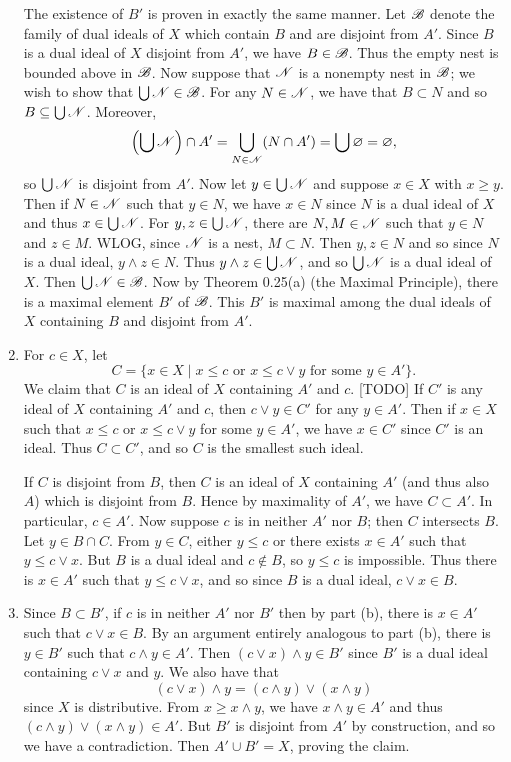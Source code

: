 \begin{prob}
\begin{enumerate}
The existence of $B'$ is proven in exactly the same manner. Let $\mathscr{B}$ denote the family of dual ideals of $X$ which contain $B$ and are disjoint from $A'$. Since $B$ is a dual ideal of $X$ disjoint from $A'$, we have $B \in \mathscr{B}$. Thus the empty nest is bounded above in $\mathscr{B}$. Now suppose that $\mathscr{N}$ is a nonempty nest in $\mathscr{B}$; we wish to show that $\bigcup\mathscr{N} \in \mathscr{B}$. For any $N \in \mathscr{N}$, we have that $B \subset N$ and so $B \subseteq \bigcup\mathscr{N}$. Moreover, \[\left(\bigcup\mathscr{N}\right)\cap A' = \bigcup_{N \in \mathscr{N}}(N\cap A') = \bigcup\varnothing = \varnothing,\] so $\bigcup\mathscr{N}$ is disjoint from $A'$. Now let $y \in \bigcup\mathscr{N}$ and suppose $x \in X$ with $x\geq y$. Then if $N \in \mathscr{N}$ such that $y \in N$, we have $x \in N$ since $N$ is a dual ideal of $X$ and thus $x \in \bigcup\mathscr{N}$. For $y, z \in \bigcup\mathscr{N}$, there are $N, M \in \mathscr{N}$ such that $y \in N$ and $z \in M$. WLOG, since $\mathscr{N}$ is a nest, $M \subset N$. Then $y, z \in N$ and so since $N$ is a dual ideal, $y\wedge z \in N$. Thus $y \wedge z \in \bigcup\mathscr{N}$, and so $\bigcup\mathscr{N}$ is a dual ideal of $X$. Then $\bigcup\mathscr{N} \in \mathscr{B}$. Now by Theorem 0.25(a) (the Maximal Principle), there is a maximal element $B'$ of $\mathscr{B}$. This $B'$ is maximal among the dual ideals of $X$ containing $B$ and disjoint from $A'$.

\item For $c \in X$, let \[C = \{x \in X\mid x \leq c\text{ or } x \leq c\vee y\text{ for some }y \in A'\}.\] We claim that $C$ is an ideal of $X$ containing $A'$ and $c$. [TODO] If $C'$ is any ideal of $X$ containing $A'$ and $c$, then $c\vee y \in C'$ for any $y \in A'$. Then if $x \in X$ such that $x \leq c$ or $x \leq c\vee y$ for some $y \in A'$, we have $x \in C'$ since $C'$ is an ideal. Thus $C \subset C'$, and so $C$ is the smallest such ideal.

If $C$ is disjoint from $B$, then $C$ is an ideal of $X$ containing $A'$ (and thus also $A$) which is disjoint from $B$. Hence by maximality of $A'$, we have $C \subset A'$. In particular, $c \in A'$. Now suppose $c$ is in neither $A'$ nor $B$; then $C$ intersects $B$. Let $y \in B\cap C$. From $y \in C$, either $y \leq c$ or there exists $x \in A'$ such that $y \leq c\vee x$. But $B$ is a dual ideal and $c \not \in B$, so $y \leq c$ is impossible. Thus there is $x \in A'$ such that $y \leq c\vee x$, and so since $B$ is a dual ideal, $c\vee x \in B$.

\item Since $B \subset B'$, if $c$ is in neither $A'$ nor $B'$ then by part (b), there is $x \in A'$ such that $c\vee x \in B$. By an argument entirely analogous to part (b), there is $y \in B'$ such that $c\wedge y \in A'$. Then $(c\vee x)\wedge y \in B'$ since $B'$ is a dual ideal containing $c\vee x$ and $y$. We also have that \[(c\vee x)\wedge y = (c\wedge y)\vee (x\wedge y)\] since $X$ is distributive. From $x \geq x\wedge y$, we have $x\wedge y \in A'$ and thus $(c\wedge y)\vee (x\wedge y) \in A'$. But $B'$ is disjoint from $A'$ by construction, and so we have a contradiction. Then $A'\cup B' = X$, proving the claim.
\end{enumerate}
\end{prob}

